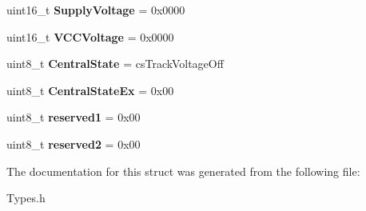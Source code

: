 \begin{DoxyCompactItemize}
uint16\+\_\+t {\bfseries Supply\+Voltage} = 0x0000
\item 
\mbox{\label{structTBT_1_1SystemState_a29bdf61d0e42828467ecc5e1b7e3c650}} 
uint16\+\_\+t {\bfseries V\+C\+C\+Voltage} = 0x0000
\item 
\mbox{\label{structTBT_1_1SystemState_afe7823596cb696c8b1f52cdf7f3ee9ef}} 
uint8\+\_\+t {\bfseries Central\+State} = cs\+Track\+Voltage\+Off
\item 
\mbox{\label{structTBT_1_1SystemState_a582d67531b086360e8fdd068cf6b2de2}} 
uint8\+\_\+t {\bfseries Central\+State\+Ex} = 0x00
\item 
\mbox{\label{structTBT_1_1SystemState_abfb73f80485c896dde08ff96122aa087}} 
uint8\+\_\+t {\bfseries reserved1} = 0x00
\item 
\mbox{\label{structTBT_1_1SystemState_a43658d0ca2d3eed1df2e0ce3b96861a3}} 
uint8\+\_\+t {\bfseries reserved2} = 0x00
\end{DoxyCompactItemize}


The documentation for this struct was generated from the following file\+:\begin{DoxyCompactItemize}
\item 
Types.\+h\end{DoxyCompactItemize}
